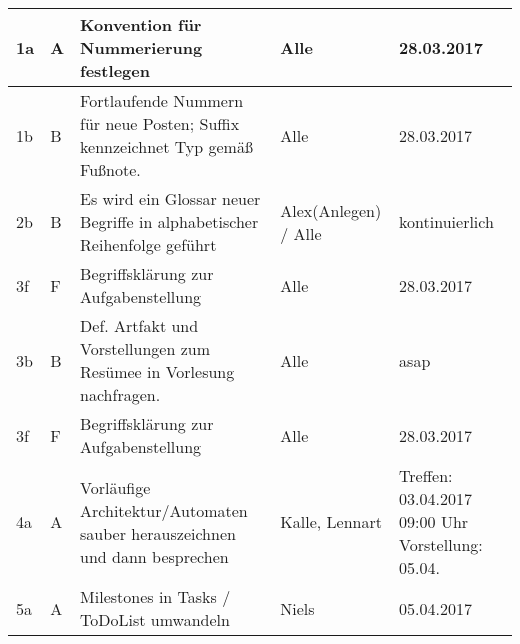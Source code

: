 \documentclass[
   draft=false
  ,paper=a4
  ,twoside=false
  ,fontsize=11pt
  ,headsepline
  ,DIV11
  ,parskip=full+
]{scrartcl} %
\begin{document}
\subsection*{\titel}
\vspace{-1em}
\begin{longtable}{
	|p{0.04\txtw} %
	|p{0.04\txtw} %
	|p{0.62\txtw} %
	|p{0.15\txtw} %
	|p{0.15\txtw} %
|}
	\tablehead

 
	1a & A & Konvention für Nummerierung festlegen & Alle & 28.03.2017 \\ \hline
		1b & B & Fortlaufende Nummern für neue Posten; Suffix kennzeichnet Typ gemäß Fußnote. & Alle & 28.03.2017 \\ \hline
			2b & B & Es wird ein Glossar neuer Begriffe in alphabetischer Reihenfolge geführt & Alex(Anlegen)
			/ Alle  & kontinuierlich  \\ \hline		

3f & F & Begriffsklärung zur Aufgabenstellung & Alle & 28.03.2017 \\ \hline

3b & B & Def. Artfakt und Vorstellungen zum Resümee in Vorlesung nachfragen. & Alle & asap \\ \hline

3f & F & Begriffsklärung zur Aufgabenstellung & Alle & 28.03.2017 \\ \hline

4a & A & Vorläufige Architektur/Automaten sauber herauszeichnen und dann besprechen & Kalle, \qquad Lennart & Treffen: 03.04.2017 09:00 Uhr \newline Vorstellung: 05.04. \\ \hline

5a & A & Milestones in Tasks / ToDoList umwandeln & Niels & 05.04.2017 \\ \hline


\end{longtable}
\end{document}
